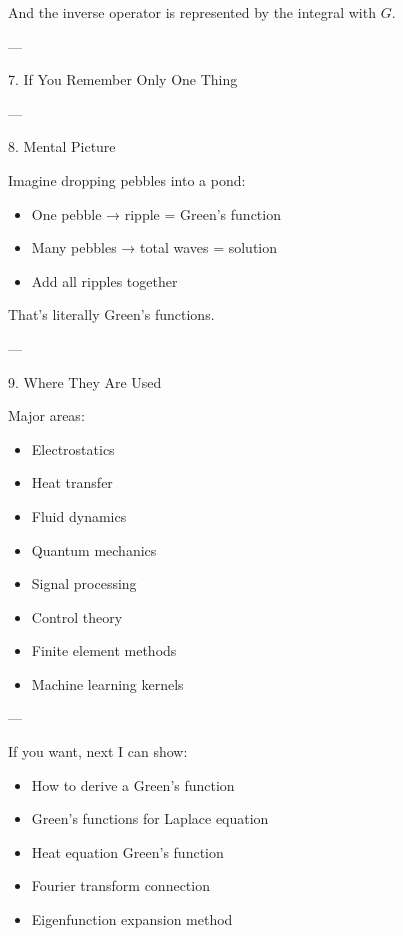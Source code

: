 \documentclass[12pt,a4paper]{report}
\begin{document}
{\begin{description}
And the inverse operator is represented by the integral with $G$.

---

\item 7. If You Remember Only One Thing



---

\item 8. Mental Picture

Imagine dropping pebbles into a pond:

\begin{itemize}
\item One pebble → ripple = Green’s function
\item Many pebbles → total waves = solution
\item Add all ripples together
\end{itemize}

That’s literally Green’s functions.

---

\item 9. Where They Are Used

Major areas:

\begin{itemize}
\item Electrostatics
\item Heat transfer
\item Fluid dynamics
\item Quantum mechanics
\item Signal processing
\item Control theory
\item Finite element methods
\item Machine learning kernels

\end{itemize}
---

\item If you want, next I can show:

\begin{itemize}
\item How to derive a Green’s function
\item Green’s functions for Laplace equation
\item Heat equation Green’s function
\item Fourier transform connection
\item Eigenfunction expansion method
\end{itemize}
\end{description}


}
\end{document}
